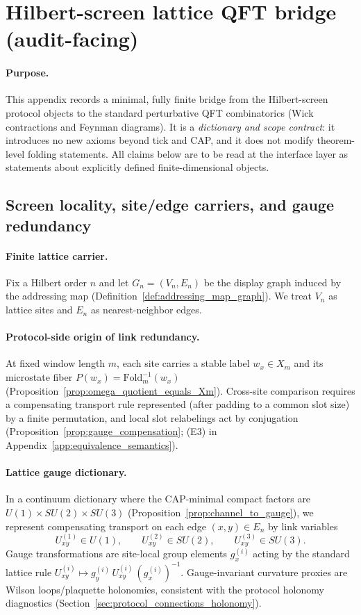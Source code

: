 \section{Hilbert-screen lattice QFT bridge (audit-facing)}
\label{app:lattice_qft_bridge_hilbert_screen}

\paragraph{Purpose.}
\AuditTag This appendix records a minimal, fully finite bridge from the Hilbert-screen protocol objects to the standard perturbative QFT combinatorics (Wick contractions and Feynman diagrams).
It is a \emph{dictionary and scope contract}: it introduces no new axioms beyond tick and CAP, and it does not modify theorem-level folding statements.
All claims below are to be read at the interface layer as statements about explicitly defined finite-dimensional objects.

\subsection{Screen locality, site/edge carriers, and gauge redundancy}

\paragraph{Finite lattice carrier.}
\MathTag Fix a Hilbert order $n$ and let $G_n=(V_n,E_n)$ be the display graph induced by the addressing map (Definition~\ref{def:addressing_map_graph}).
We treat $V_n$ as lattice sites and $E_n$ as nearest-neighbor edges.

\paragraph{Protocol-side origin of link redundancy.}
\MathTag At fixed window length $m$, each site carries a stable label $w_x\in X_m$ and its microstate fiber $P(w_x)=\mathrm{Fold}_m^{-1}(w_x)$ (Proposition~\ref{prop:omega_quotient_equals_Xm}).
Cross-site comparison requires a compensating transport rule represented (after padding to a common slot size) by a finite permutation, and local slot relabelings act by conjugation (Proposition~\ref{prop:gauge_compensation}; (E3) in Appendix~\ref{app:equivalence_semantics}).

\paragraph{Lattice gauge dictionary.}
\InterfaceTag In a continuum dictionary where the CAP-minimal compact factors are $U(1)\times SU(2)\times SU(3)$ (Proposition~\ref{prop:channel_to_gauge}), we represent compensating transport on each edge $(x,y)\in E_n$ by link variables
\[
U_{xy}^{(1)}\in U(1),\qquad U_{xy}^{(2)}\in SU(2),\qquad U_{xy}^{(3)}\in SU(3).
\]
Gauge transformations are site-local group elements $g_x^{(i)}$ acting by the standard lattice rule
$U_{xy}^{(i)}\mapsto g_y^{(i)}\,U_{xy}^{(i)}\,(g_x^{(i)})^{-1}$.
Gauge-invariant curvature proxies are Wilson loops/plaquette holonomies, consistent with the protocol holonomy diagnostics (Section~\ref{sec:protocol_connections_holonomy}).

